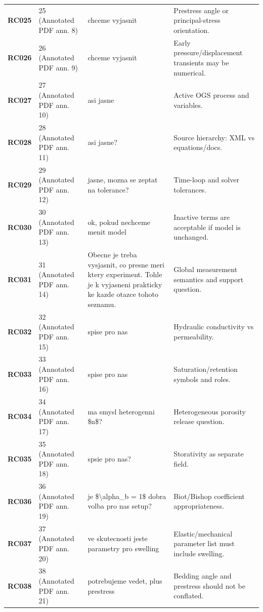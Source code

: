 \begin{longtable}{@{}L{0.10\textwidth} L{0.14\textwidth} L{0.31\textwidth} L{0.37\textwidth}@{}}
\textbf{RC025} & 25 (Annotated PDF ann. 8) & chceme vyjasnit & Prestress angle or principal-stress orientation.\\
\addlinespace[0.16em]
\textbf{RC026} & 26 (Annotated PDF ann. 9) & chceme vyjasnit & Early pressure/displacement transients may be numerical.\\
\addlinespace[0.16em]
\textbf{RC027} & 27 (Annotated PDF ann. 10) & asi jasne & Active OGS process and variables.\\
\addlinespace[0.16em]
\textbf{RC028} & 28 (Annotated PDF ann. 11) & asi jasne? & Source hierarchy: XML vs equations/docs.\\
\addlinespace[0.16em]
\textbf{RC029} & 29 (Annotated PDF ann. 12) & jasne, mozna se zeptat na tolerance? & Time-loop and solver tolerances.\\
\addlinespace[0.16em]
\textbf{RC030} & 30 (Annotated PDF ann. 13) & ok, pokud nechceme menit model & Inactive terms are acceptable if model is unchanged.\\
\addlinespace[0.16em]
\textbf{RC031} & 31 (Annotated PDF ann. 14) & Obecne je treba vysjasnit, co presne meri ktery experiment. Tohle je k vyjasneni prakticky ke kazde otazce tohoto seznamu. & Global measurement semantics and support question.\\
\addlinespace[0.16em]
\textbf{RC032} & 32 (Annotated PDF ann. 15) & spise pro nas & Hydraulic conductivity vs permeability.\\
\addlinespace[0.16em]
\textbf{RC033} & 33 (Annotated PDF ann. 16) & spise pro nas & Saturation/retention symbols and roles.\\
\addlinespace[0.16em]
\textbf{RC034} & 34 (Annotated PDF ann. 17) & ma smysl heterogenni \$n\$? & Heterogeneous porosity release question.\\
\addlinespace[0.16em]
\textbf{RC035} & 35 (Annotated PDF ann. 18) & spsie pro nas? & Storativity as separate field.\\
\addlinespace[0.16em]
\textbf{RC036} & 36 (Annotated PDF ann. 19) & je \$\textbackslash{}alpha\_b = 1\$ dobra volba pro nas setup? & Biot/Bishop coefficient appropriateness.\\
\addlinespace[0.16em]
\textbf{RC037} & 37 (Annotated PDF ann. 20) & ve skutecnosti jeste parametry pro swelling & Elastic/mechanical parameter list must include swelling.\\
\addlinespace[0.16em]
\textbf{RC038} & 38 (Annotated PDF ann. 21) & potrebujeme vedet, plus prestress & Bedding angle and prestress should not be conflated.\\

\end{longtable}

